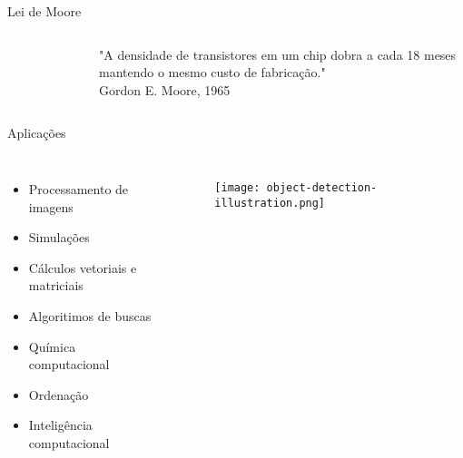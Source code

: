 \begin{frame}[t]{Lei de Moore}
       
          
        \begin{columns}
                \begin{figure}
                \end{figure}
            \LARGE
            "A densidade de transistores em um chip dobra a cada 18 meses mantendo o mesmo custo de fabricação."\\
            Gordon E. Moore, 1965
        \end{columns}
\end{frame}
\begin{frame}[t]{Aplicações}
    \begin{columns}
            \Large
            \begin{itemize}
                \item Processamento de imagens
                \item Simulações
                \item Cálculos vetoriais e matriciais
                \item Algoritimos de buscas
                \item Química computacional
                \item Ordenação
                \item Inteligência computacional
            \end{itemize}
            \begin{figure}
                \texttt{[image: object-detection-illustration.png]}
            \end{figure}  
    \end{columns}
\end{frame}
